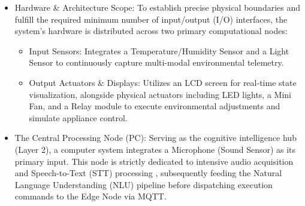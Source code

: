 \begin{itemize}
  \item Hardware \& Architecture Scope: To establish precise physical boundaries and fulfill the required minimum number of input/output (I/O) interfaces, the system's hardware is distributed across two primary computational nodes:
    \begin{itemize}
      \item Input Sensors: Integrates a Temperature/Humidity Sensor and a Light Sensor to continuously capture multi-modal environmental telemetry.
      \item Output Actuators \& Displays: Utilizes an LCD screen for real-time state visualization, alongside physical actuators including LED lights, a Mini Fan, and a Relay module to execute environmental adjustments and simulate appliance control.
    \end{itemize}

  \item The Central Processing Node (PC): Serving as the cognitive intelligence hub (Layer 2), a computer system integrates a Microphone (Sound Sensor) as its primary input. This node is strictly dedicated to intensive audio acquisition and Speech-to-Text (STT) processing , subsequently feeding the Natural Language Understanding (NLU) pipeline before dispatching execution commands to the Edge Node via MQTT.
\end{itemize}

